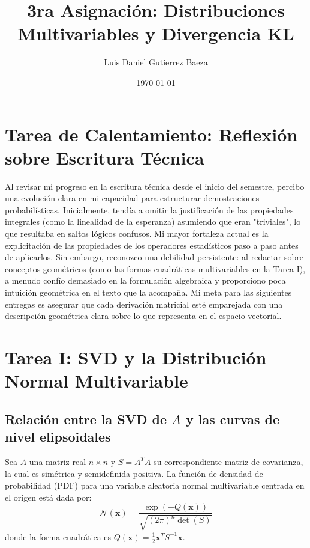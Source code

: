 \documentclass[12pt]{article}
\title{3ra Asignación: Distribuciones Multivariables y Divergencia KL}
\author{Luis Daniel Gutierrez Baeza}
\date{\today}
\begin{document}
\maketitle

\begin{center}
\end{center}
\vspace{0.5cm}

\section*{Tarea de Calentamiento: Reflexión sobre Escritura Técnica}
Al revisar mi progreso en la escritura técnica desde el inicio del semestre, percibo una evolución clara en mi capacidad para estructurar demostraciones probabilísticas. Inicialmente, tendía a omitir la justificación de las propiedades integrales (como la linealidad de la esperanza) asumiendo que eran "triviales", lo que resultaba en saltos lógicos confusos. Mi mayor fortaleza actual es la explicitación de las propiedades de los operadores estadísticos paso a paso antes de aplicarlos. Sin embargo, reconozco una debilidad persistente: al redactar sobre conceptos geométricos (como las formas cuadráticas multivariables en la Tarea I), a menudo confío demasiado en la formulación algebraica y proporciono poca intuición geométrica en el texto que la acompaña. Mi meta para las siguientes entregas es asegurar que cada derivación matricial esté emparejada con una descripción geométrica clara sobre lo que representa en el espacio vectorial.

\section*{Tarea I: SVD y la Distribución Normal Multivariable}
\subsection*{Relación entre la SVD de $A$ y las curvas de nivel elipsoidales}
Sea $A$ una matriz real $n \times n$ y $S = A^T A$ su correspondiente matriz de covarianza, la cual es simétrica y semidefinida positiva. La función de densidad de probabilidad (PDF) para una variable aleatoria normal multivariable centrada en el origen está dada por:
\begin{equation}
    \mathcal{N}(\mathbf{x}) = \frac{\exp(-Q(\mathbf{x}))}{\sqrt{(2\pi)^n \det(S)}}
\end{equation}
donde la forma cuadrática es $Q(\mathbf{x}) = \frac{1}{2} \mathbf{x}^T S^{-1} \mathbf{x}$.
\end{document}
